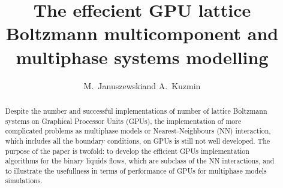 \documentclass[mathpazo]{cicp}
\begin{document}
\title{The effecient GPU lattice Boltzmann multicomponent and multiphase systems modelling}

\author[M.~Januszewski and A.~Kuzmin]{M.~Januszewski\corrauth and A.~Kuzmin}
\address{\ University, Poland\\
\ Department of Mechanical and Manufacturing Engineering,
Schulich School of Engineering,
University of Calgary, Canada
}



\begin{abstract}
Despite the number and successful implementations of number of lattice Boltzmann systems on Graphical Processor Units (GPUs), the implementation of more complicated problems as multiphase models or Nearest-Neighbours (NN) interaction, which includes all the boundary conditions, on GPUs is still not well developed. The purpose of the paper is twofold: to develop the efficient GPUs implementation algorithms for the binary liquids flows, which are subclass of the NN interactions, and to illustrate the usefullness in terms of performance of GPUs for multiphase models simulations.
\end{abstract}
\end{document}
